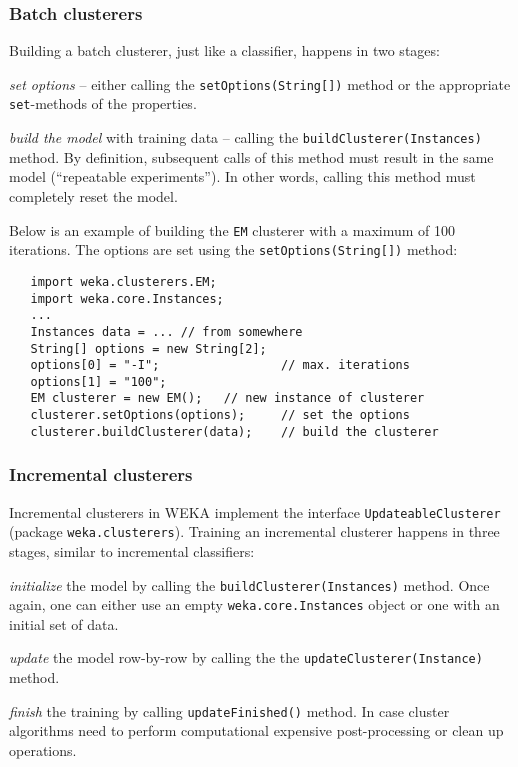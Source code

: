 \subsubsection*{Batch clusterers}
Building a batch clusterer, just like a classifier, happens in two stages:
\begin{tight_itemize}
	\item \textit{set options} -- either calling the
\texttt{setOptions(String[])} method or the appropriate \texttt{set}-methods of
the properties.
	\item \textit{build the model} with training data -- calling the
\texttt{buildClusterer(Instances)} method. By definition, subsequent calls of
this method must result in the same model (``repeatable experiments''). In other
words, calling this method must completely reset the model.
\end{tight_itemize}
Below is an example of building the \texttt{EM} clusterer with a maximum of 100
iterations. The options are set using the \texttt{setOptions(String[])} method:
\begin{verbatim}
   import weka.clusterers.EM;
   import weka.core.Instances;
   ...
   Instances data = ... // from somewhere
   String[] options = new String[2];
   options[0] = "-I";                 // max. iterations
   options[1] = "100";
   EM clusterer = new EM();   // new instance of clusterer
   clusterer.setOptions(options);     // set the options
   clusterer.buildClusterer(data);    // build the clusterer
\end{verbatim}

\subsubsection*{Incremental clusterers}
Incremental clusterers in WEKA implement the interface
\texttt{UpdateableClusterer} (package \texttt{weka.clusterers}). Training an
incremental clusterer happens in three stages, similar to incremental
classifiers:
\begin{tight_enumerate}
	\item \textit{initialize} the model by calling the
\texttt{buildClusterer(Instances)} method. Once again, one can either use an
empty \texttt{weka.core.Instances} object or one with an initial set of data.
	\item \textit{update} the model row-by-row by calling the the
\texttt{updateClusterer(Instance)} method.
	\item \textit{finish} the training by calling
\texttt{updateFinished()} method. In case cluster algorithms need to perform
computational expensive post-processing or clean up operations.
\end{tight_enumerate}

